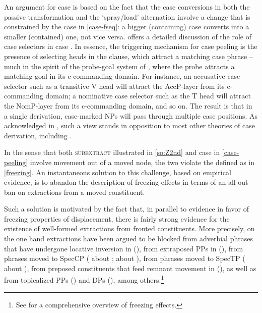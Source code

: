 \vskip -1.25cm

\noindent An argument for case  is based on the fact that the case conversions in both the passive transformation and the  `spray/load' alternation involve a change that is constrained by the case  in \ref{case-fseq}: a bigger (containing) case converts into a smaller (contained) one, not vice versa. \citet[143--146]{Caha2009} offers a detailed discussion of the role of case selectors in case . In essence, the triggering mechanism for case peeling is the presence of selecting heads in the clause, which attract a matching case phrase -- much in the spirit of the probe-goal system of \cite{Chomsky2000}, where the probe attracts a matching goal in its c-commanding domain. For instance, an accusative case selector such as a transitive V head will attract the AccP-layer from its c-commanding domain; a nominative case selector such as the T head will attract the NomP-layer from its c-commanding domain, and so on. The result is that in a single derivation, case-marked NPs will pass through multiple case positions.  As acknowledged in \citet[146]{Caha2009}, such a view stands in opposition to most other theories of case derivation, including \cite{Chomsky2000}. 
\par
In the sense that both \textsc{subextract} illustrated in \ref{so:Z2nd} and case  in \ref{case-peeling} involve movement out of a moved node, the two violate the  defined as in \ref{freezing}. An instantaneous solution to this challenge, based on empirical evidence, is to abandon the description of freezing effects in terms of an all-out ban on extractions from a moved constituent. 
\par
Such a solution is motivated by the fact that, in parallel to evidence in favor of freezing properties of displacement, there is fairly strong evidence for the existence of well-formed extractions from fronted constituents. More precisely, on the one hand extractions have been argued to be blocked from adverbial phrases that have undergone locative inversion in  (\citealt{Huy1976}), from extraposed PPs in  (\citealt{Wexler-Culicover1980}), from phrases moved to SpecCP (\citealt{LS1992} about ;  \citealt{Fanselow1987,Grewendorf1989,Muller1998,Muller2010} about ), from phrases moved to SpecTP (\citealt{Browning1991,Collins1994,BG2007} about ), from preposed constituents that feed remnant movement in  (\citealt{Muller1998}), as well as from  topicalized PPs (\citealt{Postal1972}) and DPs (\citealt{LS1992}), among others.\footnote{See \cite{Corver2017} for a comprehensive overview of freezing effects. 
} %
